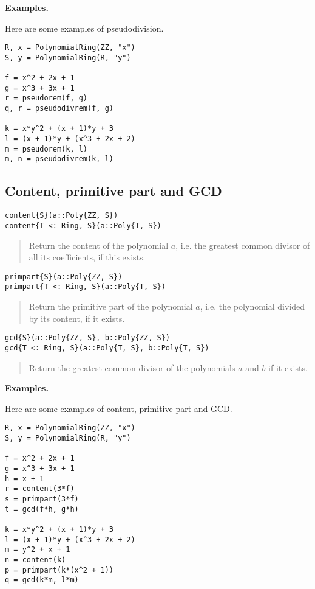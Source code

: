 \documentclass[a4paper,10pt]{article}
\newcommand{\desc}[1]{\vspace{-3mm}\begin{quote}#1\end{quote}}
\begin{document}
{{{\textbf{Examples.}

Here are some examples of pseudodivision.

\begin{lstlisting}
R, x = PolynomialRing(ZZ, "x")
S, y = PolynomialRing(R, "y")

f = x^2 + 2x + 1
g = x^3 + 3x + 1
r = pseudorem(f, g)
q, r = pseudodivrem(f, g)

k = x*y^2 + (x + 1)*y + 3
l = (x + 1)*y + (x^3 + 2x + 2)
m = pseudorem(k, l)
m, n = pseudodivrem(k, l)
\end{lstlisting}

\subsection{Content, primitive part and GCD}

\begin{lstlisting}
content{S}(a::Poly{ZZ, S})
content{T <: Ring, S}(a::Poly{T, S})
\end{lstlisting}

\desc{Return the content of the polynomial $a$, i.e. the greatest common divisor
of all its coefficients, if this exists.}

\begin{lstlisting}
primpart{S}(a::Poly{ZZ, S})
primpart{T <: Ring, S}(a::Poly{T, S})
\end{lstlisting}

\desc{Return the primitive part of the polynomial $a$, i.e. the polynomial
divided by its content, if it exists.}

\begin{lstlisting}
gcd{S}(a::Poly{ZZ, S}, b::Poly{ZZ, S})
gcd{T <: Ring, S}(a::Poly{T, S}, b::Poly{T, S})
\end{lstlisting}

\desc{Return the greatest common divisor of the polynomials $a$ and $b$ if it exists.}

\textbf{Examples.}

Here are some examples of content, primitive part and GCD.

\begin{lstlisting}
R, x = PolynomialRing(ZZ, "x")
S, y = PolynomialRing(R, "y")

f = x^2 + 2x + 1
g = x^3 + 3x + 1
h = x + 1
r = content(3*f)
s = primpart(3*f)
t = gcd(f*h, g*h)

k = x*y^2 + (x + 1)*y + 3
l = (x + 1)*y + (x^3 + 2x + 2)
m = y^2 + x + 1
n = content(k)
p = primpart(k*(x^2 + 1))
q = gcd(k*m, l*m)
\end{lstlisting}

}}}
\end{document}
